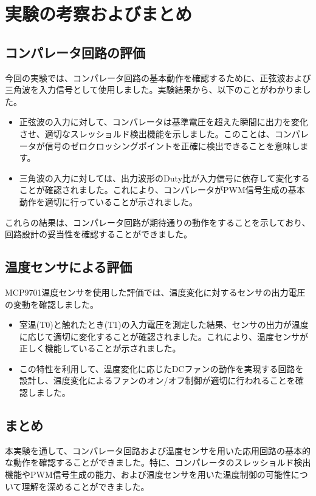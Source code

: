 \documentclass[a4paper,11pt,xelatex,ja=standard]{bxjsarticle}
\begin{document}
\section{実験の考察およびまとめ}

        \subsection{コンパレータ回路の評価}
        今回の実験では、コンパレータ回路の基本動作を確認するために、正弦波および三角波を入力信号として使用しました。実験結果から、以下のことがわかりました。
        
        \begin{itemize}
            \item 正弦波の入力に対して、コンパレータは基準電圧を超えた瞬間に出力を変化させ、適切なスレッショルド検出機能を示しました。このことは、コンパレータが信号のゼロクロッシングポイントを正確に検出できることを意味します。
            \item 三角波の入力に対しては、出力波形のDuty比が入力信号に依存して変化することが確認されました。これにより、コンパレータがPWM信号生成の基本動作を適切に行っていることが示されました。
        \end{itemize}
        
        これらの結果は、コンパレータ回路が期待通りの動作をすることを示しており、回路設計の妥当性を確認することができました。
        
        \subsection{温度センサによる評価}
        MCP9701温度センサを使用した評価では、温度変化に対するセンサの出力電圧の変動を確認しました。
        
        \begin{itemize}
            \item 室温(T0)と触れたとき(T1)の入力電圧を測定した結果、センサの出力が温度に応じて適切に変化することが確認されました。これにより、温度センサが正しく機能していることが示されました。
            \item この特性を利用して、温度変化に応じたDCファンの動作を実現する回路を設計し、温度変化によるファンのオン/オフ制御が適切に行われることを確認しました。
        \end{itemize}
        
        \subsection{まとめ}
        本実験を通して、コンパレータ回路および温度センサを用いた応用回路の基本的な動作を確認することができました。特に、コンパレータのスレッショルド検出機能やPWM信号生成の能力、および温度センサを用いた温度制御の可能性について理解を深めることができました。
        
\end{document}
